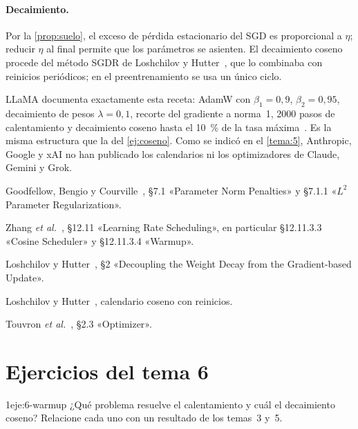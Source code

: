 \paragraph{Decaimiento.} Por la \cref{prop:suelo}, el exceso de pérdida estacionario del SGD es proporcional a $\eta$; reducir $\eta$ al final permite que los parámetros se asienten. El decaimiento coseno procede del método SGDR de Loshchilov y Hutter~\cite{sgdr}, que lo combinaba con reinicios periódicos; en el preentrenamiento se usa un único ciclo.

\begin{observacion}
LLaMA documenta exactamente esta receta: AdamW con $\beta_1=0{,}9$, $\beta_2=0{,}95$, decaimiento de pesos $\lambda=0{,}1$, recorte del gradiente a norma~1, 2000 pasos de calentamiento y decaimiento coseno hasta el 10~\% de la tasa máxima~\cite[§2.3]{llama}. Es la misma estructura que la del \cref{ej:coseno}. Como se indicó en el \cref{tema:5}, Anthropic, Google y xAI no han publicado los calendarios ni los optimizadores de Claude, Gemini y Grok.
\end{observacion}

\begin{lecturas}
\item Goodfellow, Bengio y Courville~\cite{gbc}, §7.1 «Parameter Norm Penalties» y §7.1.1 «$L^2$ Parameter Regularization».
\item Zhang \emph{et al.}~\cite{d2l}, §12.11 «Learning Rate Scheduling», en particular §12.11.3.3 «Cosine Scheduler» y §12.11.3.4 «Warmup».
\item Loshchilov y Hutter~\cite{adamw}, §2 «Decoupling the Weight Decay from the Gradient-based Update».
\item Loshchilov y Hutter~\cite{sgdr}, calendario coseno con reinicios.
\item Touvron \emph{et al.}~\cite{llama}, §2.3 «Optimizer».
\end{lecturas}

\section*{Ejercicios del tema 6}

\begin{ejercicio}{1}{eje:6-warmup}
¿Qué problema resuelve el calentamiento y cuál el decaimiento coseno? Relacione cada uno con un resultado de los temas~3 y~5.
\end{ejercicio}

